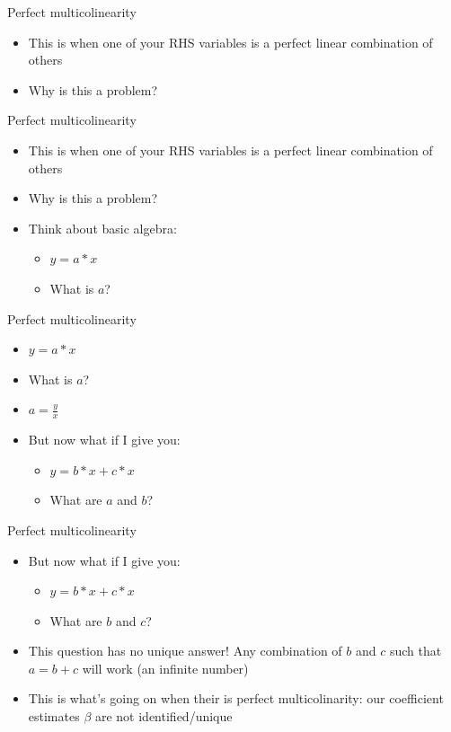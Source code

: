 \documentclass[aspectratio=169]{beamer}
\begin{document}
\begin{frame}{Perfect multicolinearity}
    \begin{itemize}
        \item This is when one of your RHS variables is a perfect linear combination of others
        \item Why is this a problem?
    \end{itemize}
\end{frame}

\begin{frame}{Perfect multicolinearity}
    \begin{itemize}
        \item This is when one of your RHS variables is a perfect linear combination of others
        \item Why is this a problem?
        \item Think about basic algebra:
        \begin{itemize}
            \item $y = a*x$
            \item What is $a$?
        \end{itemize}
    \end{itemize}
\end{frame}

\begin{frame}{Perfect multicolinearity}
    \begin{itemize}
        \item $y = a*x$
        \item What is $a$?
        \item $a = \frac{y}{x}$
        \item But now what if I give you:
        \begin{itemize}
            \item $y = b*x + c*x $
            \item What are $a$ and $b$?
        \end{itemize}
    \end{itemize}
\end{frame}

\begin{frame}{Perfect multicolinearity}
    \begin{itemize}
        \item But now what if I give you:
        \begin{itemize}
            \item $y = b*x + c*x $
            \item What are $b$ and $c$?
        \end{itemize}
        \item This question has no unique answer! Any combination of $b$ and $c$ such that $a = b + c$ will work (an infinite number)
        \item This is what's going on when their is perfect multicolinarity: our coefficient estimates $\beta$ are not identified/unique
    \end{itemize}
\end{frame}
\end{document}
